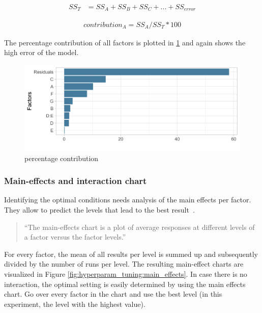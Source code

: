 \begin{equation}
	\begin{split}
		SS_T & = SS_A + SS_B + SS_C + ... + SS_{error}
	\end{split}
	 \label{equ:hyperparam_tuning:ss_t}
\end{equation}

\begin{equation}
	\begin{split}
		contribution_A = SS_A / SS_T * 100
	\end{split}
	 \label{equ:hyperparam_tuning:contribution}
\end{equation}

The percentage contribution of all factors is plotted in \ref{fig:hyperparam_tuning:percentage_contribution} and again shows the high error of the model. 

\begin{figure}[ht] 
	\includegraphics[width=1\linewidth]{simulations/taguchi/plots/percentage_contribution}
	\caption{percentage contribution}
	\label{fig:hyperparam_tuning:percentage_contribution}
\end{figure}

\subsubsection{Main-effects and interaction chart}
Identifying the optimal conditions needs analysis of the main effects per factor. They allow to predict the levels that lead to the best result~\cite{roy_primer_1990}.

\begin{quote}
	\begin{em}
		\enquote{The main-effects chart is a plot of average responses at different levels of a factor versus the factor levels.}~\cite{yang_design_2009}
	\end{em}
\end{quote}

For every factor, the mean of all results per level is summed up and subsequently divided by the number of runs per level. The resulting main-effect charts are visualized in Figure \ref{fig:hyperparam_tuning:main_effects}. In case there is no interaction, the optimal setting is easily determined by using the main effects chart. Go over every factor in the chart and use the best level (in this experiment, the level with the highest value).

